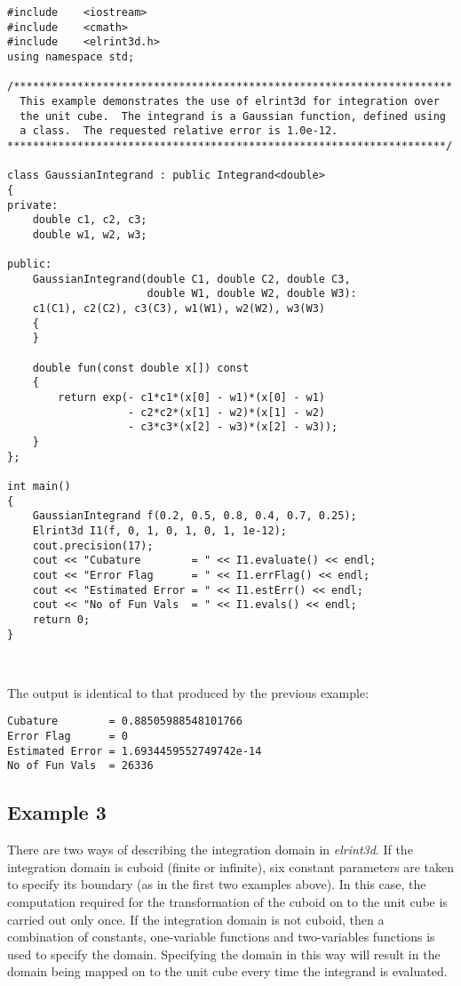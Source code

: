 \documentclass[10pt]{article}
\def \algorithmNoSpace {\textit{elrint3d}}
\begin{document}
\begin{verbatim}
#include    <iostream>
#include    <cmath>
#include    <elrint3d.h>
using namespace std;

/*********************************************************************
  This example demonstrates the use of elrint3d for integration over 
  the unit cube.  The integrand is a Gaussian function, defined using 
  a class.  The requested relative error is 1.0e-12.
*********************************************************************/

class GaussianIntegrand : public Integrand<double>
{
private:
    double c1, c2, c3;
    double w1, w2, w3;
   
public:
    GaussianIntegrand(double C1, double C2, double C3, 
                      double W1, double W2, double W3):
    c1(C1), c2(C2), c3(C3), w1(W1), w2(W2), w3(W3)
    {
    }

    double fun(const double x[]) const
    {  
        return exp(- c1*c1*(x[0] - w1)*(x[0] - w1)
                   - c2*c2*(x[1] - w2)*(x[1] - w2)
                   - c3*c3*(x[2] - w3)*(x[2] - w3));
    }
};

int main()
{
    GaussianIntegrand f(0.2, 0.5, 0.8, 0.4, 0.7, 0.25);
    Elrint3d I1(f, 0, 1, 0, 1, 0, 1, 1e-12);
    cout.precision(17);
    cout << "Cubature        = " << I1.evaluate() << endl;
    cout << "Error Flag      = " << I1.errFlag() << endl;
    cout << "Estimated Error = " << I1.estErr() << endl;
    cout << "No of Fun Vals  = " << I1.evals() << endl;
    return 0;
}
\end{verbatim}

\ 

\noindent The output is identical to that produced by the previous example:

\begin{verbatim}
Cubature        = 0.88505988548101766
Error Flag      = 0
Estimated Error = 1.6934459552749742e-14
No of Fun Vals  = 26336
\end{verbatim}

\subsection{Example 3}

There are two ways of describing the integration domain in \algorithmNoSpace.  If the integration domain is cuboid (finite or infinite), six constant parameters are taken to specify its boundary (as in the first two examples above).  In this case, the computation required for the transformation of the cuboid on to the unit cube is carried out only once.  If the integration domain is not cuboid, then a combination of constants, one-variable functions and two-variables functions is used to specify the domain.  Specifying the domain in this way will result in the domain being mapped on to the unit cube every time the integrand is evaluated. 
\end{document}
